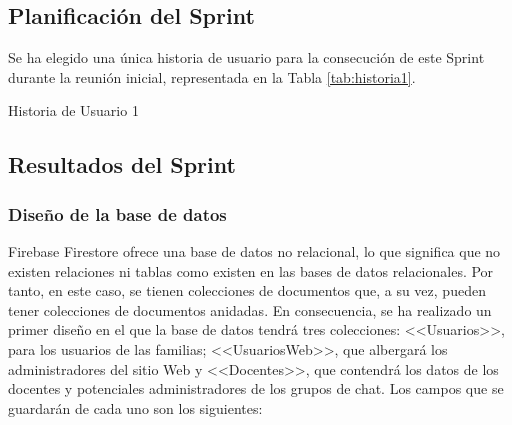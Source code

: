 \subsection{Planificación del Sprint}
Se ha elegido una única historia de usuario para la consecución de este Sprint durante la reunión inicial, representada en la Tabla \ref{tab:historia1}.

\begin{table}[hp]
	\centering
	{\small
		
	}
	\caption[Historia de Usuario 1]
	{Historia de Usuario 1}
	\label{tab:historia1}
\end{table}

\subsection{Resultados del Sprint}
\subsubsection{Diseño de la base de datos}
Firebase Firestore ofrece una base de datos no relacional, lo que significa que no existen relaciones ni tablas como existen en las bases de datos relacionales. Por tanto, en este caso, se tienen colecciones de documentos que, a su vez, pueden tener colecciones de documentos anidadas. En consecuencia, se ha realizado un primer diseño en el que la base de datos tendrá tres colecciones: <<Usuarios>>, para los usuarios de las familias; <<UsuariosWeb>>, que albergará los administradores del sitio Web y <<Docentes>>, que contendrá los datos de los docentes y potenciales administradores de los grupos de chat. Los campos que se guardarán de cada uno son los siguientes:


